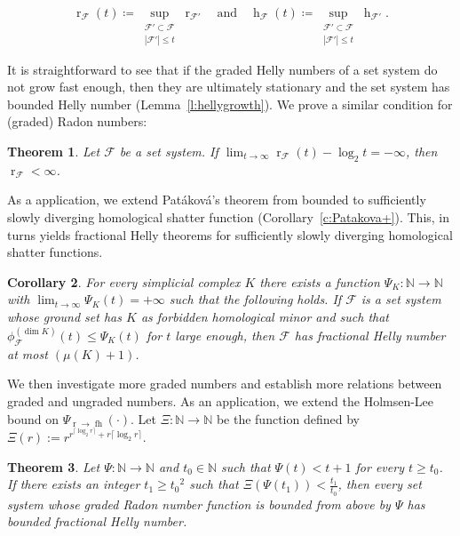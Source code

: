 \documentclass[a4paper,UKenglish,thm-restate]{article}
\newcommand{\N}{\mathbb{N}}
\newcommand{\F}{\mathcal{F}}
\DeclareMathOperator{\h}{h}
\DeclareMathOperator{\rad}{r}
\DeclareMathOperator{\fh}{fh}
\newcommand{\pth}[1]{\left(#1\right)}
\newtheorem{theorem}{Theorem}
\newtheorem{corollary}[theorem]{Corollary}
\begin{document}
\begin{equation}
  \rad_\F(t) \coloneqq \sup \limits_{\substack{\F'\subset \F \\ |\F'|\leq t}} \rad_{\F'}
 \quad \text{and} \quad
 \h_\F(t) \coloneqq \sup\limits_{\substack{\F'\subset \F \\ |\F'|\leq t}} \h_{\F'}.
\end{equation}

\noindent
It is straightforward to see that if the graded Helly numbers of a set system do not grow fast enough, then they are ultimately stationary and the set system has bounded Helly number (Lemma~\ref{l:hellygrowth}). We prove a similar condition for (graded) Radon numbers:

\begin{theorem}\label{t:radgrowth}
  Let $\F$ be a set system. If $\lim_{t \to \infty} \rad_\F(t) - \log_2 t = -\infty$, then $\rad_\F < \infty$.
\end{theorem}

\noindent
As a application, we extend Patáková's theorem from bounded to sufficiently slowly diverging homological shatter function (Corollary~\ref{c:Patakova+}). This, in turns yields fractional Helly theorems for sufficiently slowly diverging homological shatter functions.

\begin{corollary}\label{c:itgrows!}
  For every simplicial complex $K$ there exists a function $\Psi_K : \N \to \N$ with $\lim_{t \to \infty} \Psi_K(t) = +\infty$ such that the following holds. If $\F$ is a set system whose ground set has $K$ as forbidden homological minor and such that $\phi_{\F}^{(\dim K)}(t) \le \Psi_K(t)$ for $t$ large enough, then $\F$ has fractional Helly number at most $(\mu(K)+1)$.
\end{corollary}

\medskip

We then investigate more graded numbers and establish more relations between graded and ungraded numbers. As an application, we extend the Holmsen-Lee bound on $\Psi_{\rad \to \fh}(\cdot)$. Let $\Xi: \N \to \N$ be the function defined by $\Xi(r) := r^{r^{\lceil \log_2r \rceil}+r\lceil \log_2r \rceil}$. 

\begin{theorem}\label{t:radgrowth2}
  Let $\Psi: \N\rightarrow \N$ and $t_0 \in \N$ such that $\Psi(t) < t+1$ for every $t \ge t_0$. If there exists an integer $t_1 \ge {t_0}^2$ such that $\Xi\pth{\Psi(t_1)} < \frac{t_1}{t_0}$, then every set system whose graded Radon number function is bounded from above by $\Psi$ has bounded fractional Helly number.
\end{theorem}
\end{document}

